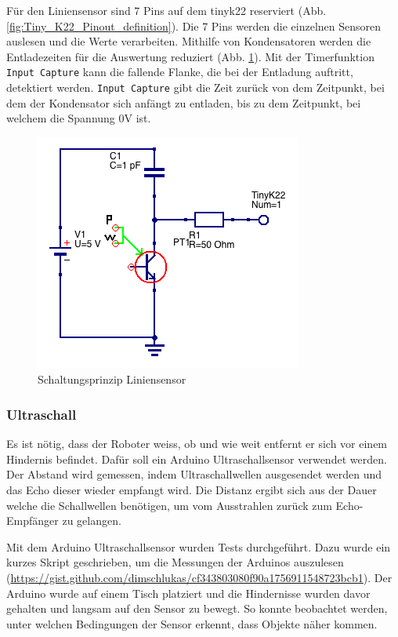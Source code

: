 Für den Liniensensor sind 7 Pins auf dem \gls{tinyk22} reserviert (Abb. \ref{fig:Tiny_K22_Pinout_definition}). Die 7 Pins werden die einzelnen Sensoren auslesen und die Werte verarbeiten. Mithilfe von Kondensatoren werden die Entladezeiten für die Auswertung reduziert (Abb. \ref{fig:Liniensensor_Schaltung}). Mit der Timerfunktion \verb|Input Capture| kann die fallende Flanke, die bei der Entladung auftritt, detektiert werden. \verb|Input Capture| gibt die Zeit zurück von dem Zeitpunkt, bei dem der Kondensator sich anfängt zu entladen, bis zu dem Zeitpunkt, bei welchem die Spannung 0V ist.

\begin{figure}[H]
    \centering
    \includegraphics[width=0.4\linewidth]{img/Liniensensor_Schaltung.png}
    \caption{Schaltungsprinzip Liniensensor}
    \label{fig:Liniensensor_Schaltung}
\end{figure}

\subsubsection*{Ultraschall}

Es ist nötig, dass der Roboter weiss, ob und wie weit entfernt er sich vor einem Hindernis befindet. Dafür soll ein Arduino Ultraschallsensor verwendet werden. Der Abstand wird gemessen, indem Ultraschallwellen ausgesendet werden und das Echo dieser wieder empfangt wird. Die Distanz ergibt sich aus der Dauer welche die Schallwellen benötigen, um vom Ausstrahlen zurück zum Echo-Empfänger zu gelangen.

Mit dem Arduino Ultraschallsensor wurden Tests durchgeführt. Dazu wurde ein kurzes Skript geschrieben, um die Messungen der Arduinos auszulesen (\url{https://gist.github.com/dimschlukas/cf343803080f90a1756911548723bcb1}). Der Arduino wurde auf einem Tisch platziert und die Hindernisse wurden davor gehalten und langsam auf den Sensor zu bewegt. So konnte beobachtet werden, unter welchen Bedingungen der Sensor erkennt, dass Objekte näher kommen.

